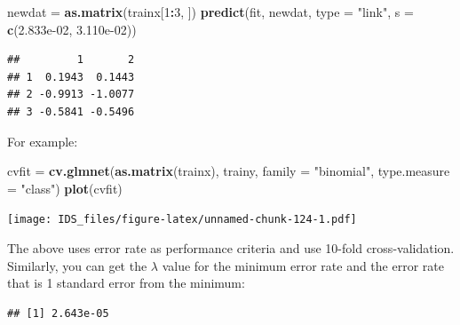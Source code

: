 \documentclass[12pt,]{krantz}
\makeatletter
\newenvironment{Shaded}{\begin{snugshade}}{\end{snugshade}}
\newcommand{\DataTypeTok}[1]{\textcolor[rgb]{0.27,0.27,0.27}{#1}}
\newcommand{\DecValTok}[1]{\textcolor[rgb]{0.06,0.06,0.06}{#1}}
\newcommand{\FloatTok}[1]{\textcolor[rgb]{0.06,0.06,0.06}{#1}}
\newcommand{\KeywordTok}[1]{\textcolor[rgb]{0.27,0.27,0.27}{\textbf{#1}}}
\newcommand{\NormalTok}[1]{#1}
\newcommand{\OperatorTok}[1]{\textcolor[rgb]{0.43,0.43,0.43}{\textbf{#1}}}
\newcommand{\StringTok}[1]{\textcolor[rgb]{0.5,0.5,0.5}{#1}}
\newenvironment{kframe}{%
\medskip{}
\setlength{\fboxsep}{.8em}
 \def\at@end@of@kframe{}%
 \ifinner\ifhmode%
  \def\at@end@of@kframe{\end{minipage}}%
  \begin{minipage}{\columnwidth}%
 \fi\fi%
 \def\FrameCommand##1{\hskip\@totalleftmargin \hskip-\fboxsep
 \colorbox{shadecolor}{##1}\hskip-\fboxsep
     \hskip-\linewidth \hskip-\@totalleftmargin \hskip\columnwidth}%
 \MakeFramed {\advance\hsize-\width
   \@totalleftmargin\z@ \linewidth\hsize
   \@setminipage}}%
 {\par\unskip\endMakeFramed%
 \at@end@of@kframe}
\renewenvironment{Shaded}{\begin{kframe}}{\end{kframe}}
\makeatother
\begin{document}
\begin{Shaded}
\begin{Highlighting}[]
\NormalTok{newdat =}\StringTok{ }\KeywordTok{as.matrix}\NormalTok{(trainx[}\DecValTok{1}\OperatorTok{:}\DecValTok{3}\NormalTok{, ])}
\KeywordTok{predict}\NormalTok{(fit, newdat, }\DataTypeTok{type =} \StringTok{"link"}\NormalTok{, }\DataTypeTok{s =} \KeywordTok{c}\NormalTok{(}\FloatTok{2.833e-02}\NormalTok{, }\FloatTok{3.110e-02}\NormalTok{))}
\end{Highlighting}
\end{Shaded}

\begin{verbatim}
##         1       2
## 1  0.1943  0.1443
## 2 -0.9913 -1.0077
## 3 -0.5841 -0.5496
\end{verbatim}

For example:

\begin{Shaded}
\begin{Highlighting}[]
\NormalTok{cvfit =}\StringTok{ }\KeywordTok{cv.glmnet}\NormalTok{(}\KeywordTok{as.matrix}\NormalTok{(trainx), trainy, }\DataTypeTok{family =} \StringTok{"binomial"}\NormalTok{, }\DataTypeTok{type.measure =} \StringTok{"class"}\NormalTok{)}
\KeywordTok{plot}\NormalTok{(cvfit)}
\end{Highlighting}
\end{Shaded}

\texttt{[image: IDS\_files/figure-latex/unnamed-chunk-124-1.pdf]}

The above uses error rate as performance criteria and use 10-fold cross-validation. Similarly, you can get the \(\lambda\) value for the minimum error rate and the error rate that is 1 standard error from the minimum:

\begin{Shaded}
\end{Shaded}

\begin{verbatim}
## [1] 2.643e-05
\end{verbatim}

\begin{Shaded}
\end{Shaded}
\end{document}
